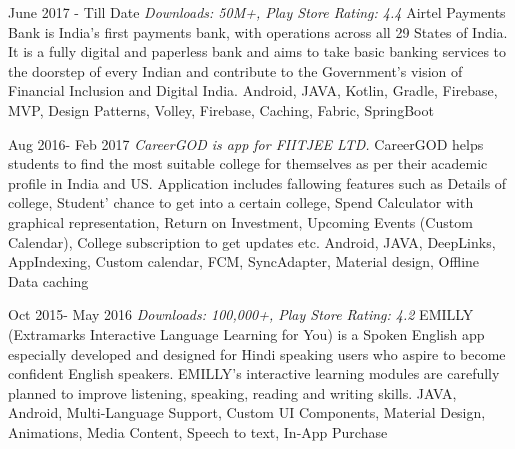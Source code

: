 %
%
%

\pagebreak
{}

\begin{projects}
    \project
	{}{June 2017 - Till Date}
	{ \textit{Downloads: 50M+, Play Store Rating: 4.4}}
{ Airtel Payments Bank is India’s first payments bank, with operations across all 29 States of India. It is a fully digital and paperless bank and aims to take basic banking services to the doorstep of every Indian and contribute to the Government’s vision of Financial Inclusion and Digital India.}
	{Android, JAVA, Kotlin, Gradle, Firebase, MVP, Design Patterns, Volley, Firebase, Caching, Fabric, SpringBoot}
    	\linebreak
        
          \project
	{}{Aug 2016-  Feb 2017}
	{\textit{CareerGOD is app for FIITJEE LTD.}}
{CareerGOD helps students to find the most suitable college for themselves as per their academic profile in India and US. Application includes fallowing features such as  Details of college, Student' chance to get into a certain college, Spend Calculator with graphical representation, Return on Investment, Upcoming Events (Custom Calendar), College subscription to get updates etc. }
	{Android, JAVA, DeepLinks, AppIndexing, Custom calendar, FCM, SyncAdapter, Material design, Offline Data caching}    
    \linebreak
    
    	\project
	{}{Oct 2015-  May 2016}
	{\textit{Downloads: 100,000+, Play Store Rating: 4.2}}
{EMILLY (Extramarks Interactive Language Learning for You) is a Spoken English app especially developed and designed for Hindi speaking users who aspire to become confident English speakers. 
EMILLY’s interactive learning modules are carefully planned to improve listening, speaking, reading and writing skills. }
	{JAVA, Android, Multi-Language Support, Custom UI Components, Material Design, Animations, Media Content, Speech to text, In-App Purchase}
    \linebreak
    

\end{projects}
